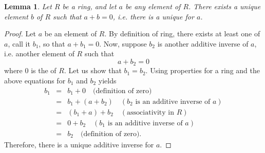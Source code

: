 \documentclass[12pt]{article}
\newtheorem*{lemma}{Lemma}
\begin{document}
\begin{lemma}
Let $R$ be a ring, and let $a$ be any element of $R$. There exists a unique element $b$ of $R$ such that $a+b=0$, i.e. there is a unique  for $a$.
\end{lemma}
\begin{proof}
Let $a$ be an element of $R$. By definition of ring, there exists at least one  of $a$, call it $b_1$, so that $a+b_1=0$. Now, suppose $b_2$ is another additive inverse of $a$, i.e. another element of $R$ such that 
$$a+b_2=0$$
where $0$ is the  of $R$. Let us show that $b_1=b_2$. Using properties for a ring and the above equations for $b_1$ and $b_2$
yields
\begin{eqnarray*}
b_1 &=& b_1+0 \quad \text{(definition of zero)}\\
 &=& b_1+(a+b_2) \quad (b_2 \text{ is an additive inverse of }a)\\
 &=& (b_1+a)+b_2 \quad (\text{associativity in }R)\\
 &=& 0+b_2 \quad (b_1\text{ is an additive inverse of }a)\\
 &=& b_2 \quad \text{(definition of zero)}.
\end{eqnarray*}
Therefore, there is a unique additive inverse for $a$.
\end{proof}
\end{document}
